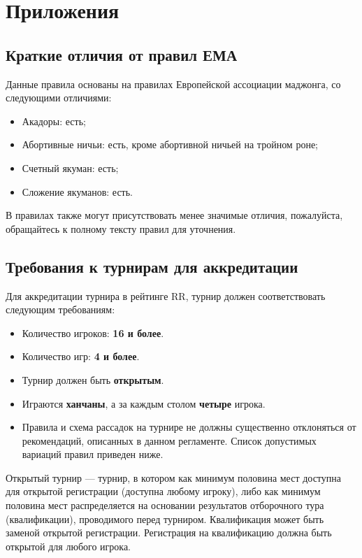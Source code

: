 \section{Приложения}

\subsection{Краткие отличия от правил ЕМА}

Данные правила основаны на правилах Европейской ассоциации маджонга, со следующими отличиями:

\begin{itemize}
	\item Акадоры: есть;
	\item Абортивные ничьи: есть, кроме абортивной ничьей на тройном роне;
	\item Счетный якуман: есть;
	\item Сложение якуманов: есть.
\end{itemize}

В правилах также могут присутствовать менее значимые отличия, пожалуйста, обращайтесь к полному тексту правил для уточнения.

\newpage

\subsection{Требования к турнирам для аккредитации}

Для аккредитации турнира в рейтинге RR, турнир должен соответствовать следующим требованиям:

\begin{itemize}
	\item Количество игроков: \textbf{16 и более}.
	\item Количество игр: \textbf{4 и более}.
	\item Турнир должен быть \textbf{открытым}.
	\item Играются \textbf{ханчаны}, а за каждым столом \textbf{четыре} игрока.
	\item Правила и схема рассадок на турнире не должны существенно отклоняться от рекомендаций, описанных в данном регламенте. Список допустимых вариаций правил приведен ниже.
\end{itemize}

Открытый турнир --- турнир, в котором как минимум половина мест доступна для открытой регистрации (доступна любому игроку), либо как минимум половина мест распределяется на основании результатов отборочного тура (квалификации), проводимого перед турниром. Квалификация может быть заменой открытой регистрации. Регистрация на квалификацию должна быть открытой для любого игрока.

